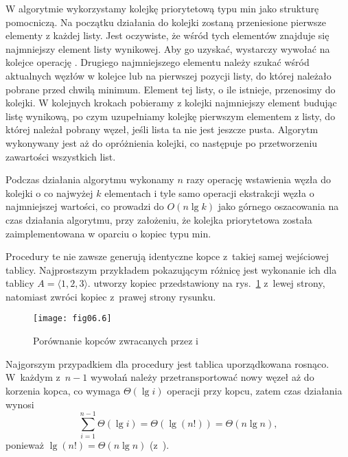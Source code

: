 \exercise %
W algorytmie wykorzystamy kolejkę priorytetową typu min jako strukturę pomocniczą. Na początku działania do kolejki zostaną przeniesione pierwsze elementy z każdej listy. Jest oczywiste, że wśród tych elementów znajduje się najmniejszy element listy wynikowej. Aby go uzyskać, wystarczy wywołać na kolejce operację . Drugiego najmniejszego elementu należy szukać wśród aktualnych węzłów w kolejce lub na pierwszej pozycji listy, do której należało pobrane przed chwilą minimum. Element tej listy, o ile istnieje, przenosimy do kolejki. W kolejnych krokach pobieramy z kolejki najmniejszy element budując listę wynikową, po czym uzupełniamy kolejkę pierwszym elementem z listy, do której należał pobrany węzeł, jeśli lista ta nie jest jeszcze pusta. Algorytm wykonywany jest aż do opróżnienia kolejki, co następuje po przetworzeniu zawartości wszystkich list.

Podczas działania algorytmu wykonamy $n$ razy operację wstawienia węzła do kolejki o co najwyżej $k$ elementach i tyle samo operacji ekstrakcji węzła o najmniejszej wartości, co prowadzi do $O(n\lg k)$ jako górnego oszacowania na czas działania algorytmu, przy założeniu, że kolejka priorytetowa została zaimplementowana w oparciu o kopiec typu min.

\problems


\subproblem %
Procedury te nie zawsze generują identyczne kopce z~takiej samej wejściowej tablicy. Najprostszym przykładem pokazującym różnicę jest wykonanie ich dla tablicy $A=\langle 1,2,3\rangle$.  utworzy kopiec przedstawiony na rys.~\ref{fig:6-1(a)} z~lewej strony, natomiast  zwróci kopiec z~prawej strony rysunku.
\begin{figure}[ht]
	\begin{center}
		\texttt{[image: fig06.6]}
	\end{center}
	\caption{Porównanie kopców zwracanych przez  i~} \label{fig:6-1(a)}
\end{figure}

\subproblem %
Najgorszym przypadkiem dla procedury  jest tablica uporządkowana rosnąco. W~każdym z~$n-1$ wywołań  należy przetransportować nowy węzeł aż do korzenia kopca, co wymaga $\Theta(\lg i)$ operacji przy  kopcu, zatem czas działania  wynosi
\[
	\sum_{i=1}^{n-1}\Theta(\lg i) = \Theta(\lg(n!)) = \Theta(n\lg n),
\]
ponieważ $\lg(n!)=\Theta(n\lg n)$ (z~).

